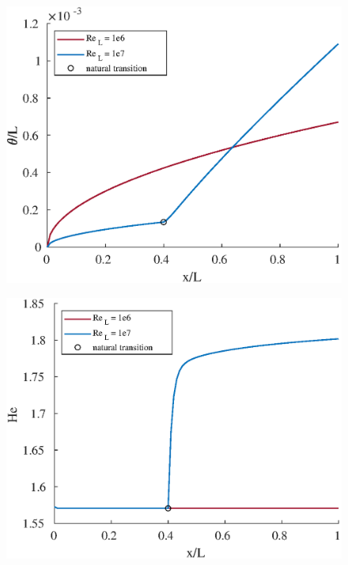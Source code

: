 


\begin{figure}[H]
\centering
\includegraphics[scale=0.8]{graphs/e6g1.eps}
\caption{}
\label{e6g1}
\end{figure}

\begin{figure}[H]
\centering
\includegraphics[scale=0.8]{graphs/e6g2.eps}
\caption{}
\label{e6g2}
\end{figure}

